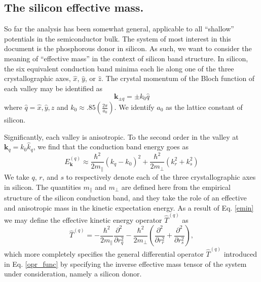 

%
%

\subsection{The silicon effective mass.}
So far the analysis has been somewhat general, applicable to all ``shallow''
potentials in the semiconductor bulk. The system of most interest in this
document is the phosphorous donor in silicon. As such, we want to consider the
meaning of ``effective mass'' in the context of silicon band structure. In
silicon, the six equivalent conduction band minima each lie along one of the
three crystallographic axes, $\hat{x}$, $\hat{y}$, or $\hat{z}$. The
crystal momentum of the Bloch function of each valley may be identified as
\begin{equation}
  \bm{k}_{\pm q} = \pm k_{0}\hat{q}
  \label{def_val}
\end{equation}
where $\hat{q} = \hat{x}, \hat{y}, \hat{z}$ and $k_{0} \approx .85
\left(\frac{2\pi}{a_0}\right)$. We identify $a_{0}$ as the lattice constant of
silicon.

Significantly, each valley is anisotropic. To the second order in the valley at
$\bm{k}_{q} = k_{0}\hat{k}_{q}$, we find that the conduction band energy goes as
\begin{equation}
  E^{(q)}_{\bm{k}}
  \approx 
  \frac{\hbar^2}{2 m_\parallel}\left(k_q - k_0\right)^2
  + \frac{\hbar^2}{2 m_\perp}\left(k_{r}^2 + k_{s}^2\right)
  \label{emin}
\end{equation}
We take $q$, $r$, and $s$ to respectively denote each of the three
crystallographic axes in silicon. The quantities $m_{\parallel}$ and $m_{\perp}$
are defined here from the empirical structure of the silicon conduction band,
and they take the role of an effective and anisotropic mass in the kinetic
expectation energy. As a result of Eq. \eqref{emin} we may define the effective
kinetic energy operator $\hat{T}^{(q)}$ as
\begin{equation}
  \hat{T}^{(q)}
  =
  - \frac{\hbar^2}{2m_\parallel}\frac{\partial^2}{\partial r_{q}^2}
  - \frac{\hbar^2}{2m_\perp}\left(
  \frac{\partial^2}{\partial r_{r}^2}
  + \frac{\partial^2}{\partial r_{s}^2}
  \right),
\end{equation}
which more completely specifies the general differential operator
$\hat{T}^{(q)}$ introduced in Eq. \eqref{opr_func} by specifying the inverse
effective mass tensor of the system under consideration, namely a silicon donor.

